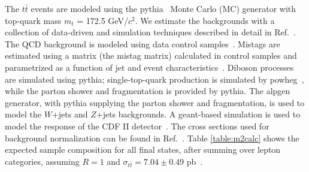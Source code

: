 \documentclass[aps,prd,twocolumn,superscriptaddress,showpacs]{revtex4}
\begin{document}
The $t\bar{t}$  events are modeled using the {\sc pythia}~\cite{pythia}  Monte Carlo (MC)
generator with top-quark mass $m_t$ = 172.5 GeV/$c^2$. 
We estimate the backgrounds
with a collection of data-driven and simulation techniques described in detail in Ref.~\cite{cuts}. 
The QCD background is modeled using data control samples~\cite{QCDback}. 
Mistags are estimated using a matrix (the mistag matrix) calculated in control samples and parametrized 
as a function of jet and event characteristics~\cite{QCDback}.
Diboson processes 
are simulated using {\sc pythia}; single-top-quark production is simulated by 
 {\sc powheg}~\cite{powheg}, while the parton shower and fragmentation is provided by {\sc pythia}.
The  {\sc alpgen}~\cite{alpgen} generator, with {\sc pythia} 
supplying the parton shower and fragmentation, is used to model the
$W$+jets and $Z$+jets backgrounds.
A {\sc geant}-based simulation is used to model the response of the CDF II
detector~\cite{geant}. The cross sections used for background normalization can be found 
in Ref.~\cite{QCDback}.
Table \ref{table:m2calc} shows the expected sample composition for all final states, after summing over lepton categories,
 assuming  $R=1$ and $\sigma_{t\bar{t}} =7.04\pm 0.49$ pb~\cite{topxsec}.
\end{document}
